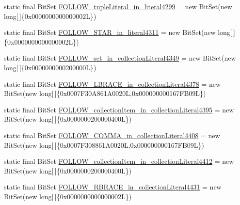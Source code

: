 \begin{DoxyCompactItemize}
\item 
static final Bit\-Set \hyperlink{classorg_1_1tzi_1_1use_1_1parser_1_1soil_1_1_soil_parser_adb1d8b3ddd01902004096b2b901bc985}{F\-O\-L\-L\-O\-W\-\_\-tuple\-Literal\-\_\-in\-\_\-literal4299} = new Bit\-Set(new long\mbox{[}$\,$\mbox{]}\{0x0000000000000002\-L\})
\item 
static final Bit\-Set \hyperlink{classorg_1_1tzi_1_1use_1_1parser_1_1soil_1_1_soil_parser_a89439fddd62260dd77aa0ca44f372b9a}{F\-O\-L\-L\-O\-W\-\_\-\-S\-T\-A\-R\-\_\-in\-\_\-literal4311} = new Bit\-Set(new long\mbox{[}$\,$\mbox{]}\{0x0000000000000002\-L\})
\item 
static final Bit\-Set \hyperlink{classorg_1_1tzi_1_1use_1_1parser_1_1soil_1_1_soil_parser_a084f14931d3892f51ce096c7517db9ab}{F\-O\-L\-L\-O\-W\-\_\-set\-\_\-in\-\_\-collection\-Literal4349} = new Bit\-Set(new long\mbox{[}$\,$\mbox{]}\{0x0000000000200000\-L\})
\item 
static final Bit\-Set \hyperlink{classorg_1_1tzi_1_1use_1_1parser_1_1soil_1_1_soil_parser_a9b53c93cdc96a9979fcf4ebcabe8d704}{F\-O\-L\-L\-O\-W\-\_\-\-L\-B\-R\-A\-C\-E\-\_\-in\-\_\-collection\-Literal4378} = new Bit\-Set(new long\mbox{[}$\,$\mbox{]}\{0x0007\-F30\-A861\-A0020\-L,0x000000000167\-F\-B09\-L\})
\item 
static final Bit\-Set \hyperlink{classorg_1_1tzi_1_1use_1_1parser_1_1soil_1_1_soil_parser_a6821eb754e9c72ca0ef7d4d03af961a8}{F\-O\-L\-L\-O\-W\-\_\-collection\-Item\-\_\-in\-\_\-collection\-Literal4395} = new Bit\-Set(new long\mbox{[}$\,$\mbox{]}\{0x0000000200000400\-L\})
\item 
static final Bit\-Set \hyperlink{classorg_1_1tzi_1_1use_1_1parser_1_1soil_1_1_soil_parser_a5dd6b6e1c3a31f0707db7a845a3bfd3a}{F\-O\-L\-L\-O\-W\-\_\-\-C\-O\-M\-M\-A\-\_\-in\-\_\-collection\-Literal4408} = new Bit\-Set(new long\mbox{[}$\,$\mbox{]}\{0x0007\-F308861\-A0020\-L,0x000000000167\-F\-B09\-L\})
\item 
static final Bit\-Set \hyperlink{classorg_1_1tzi_1_1use_1_1parser_1_1soil_1_1_soil_parser_a08632e1cc91ca3399d2ef715fc57639d}{F\-O\-L\-L\-O\-W\-\_\-collection\-Item\-\_\-in\-\_\-collection\-Literal4412} = new Bit\-Set(new long\mbox{[}$\,$\mbox{]}\{0x0000000200000400\-L\})
\item 
static final Bit\-Set \hyperlink{classorg_1_1tzi_1_1use_1_1parser_1_1soil_1_1_soil_parser_ade7e47144dbd99780aa9fbcf207b76b5}{F\-O\-L\-L\-O\-W\-\_\-\-R\-B\-R\-A\-C\-E\-\_\-in\-\_\-collection\-Literal4431} = new Bit\-Set(new long\mbox{[}$\,$\mbox{]}\{0x0000000000000002\-L\})
\item 

\end{DoxyCompactItemize}
